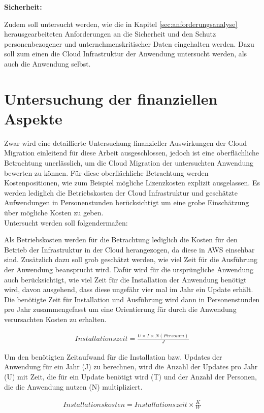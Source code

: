 \textbf{Sicherheit:}

Zudem soll untersucht werden, wie die in Kapitel \ref{sec:anforderungsanalyse} herausgearbeiteten Anforderungen an die Sicherheit und den Schutz personenbezogener und unternehmenskritischer Daten eingehalten werden. Dazu soll zum einen die Cloud Infrastruktur der Anwendung untersucht werden, als auch die Anwendung selbst.

\section{Untersuchung der finanziellen Aspekte}
Zwar wird eine detaillierte Untersuchung finanzieller Auswirkungen der Cloud \mbox{Migration} einleitend für diese Arbeit ausgeschlossen, jedoch ist eine oberflächliche Betrachtung unerlässlich, um die Cloud Migration der untersuchten Anwendung bewerten zu können. Für diese oberflächliche Betrachtung werden Kostenpositionen, wie zum Beispiel mögliche Lizenzkosten explizit ausgelassen. Es werden lediglich die Betriebskosten der Cloud Infrastruktur und geschätzte Aufwendungen in Personenstunden berücksichtigt um eine grobe Einschätzung über mögliche Kosten zu geben. \\

Untersucht werden soll folgendermaßen:

Als Betriebskosten werden für die Betrachtung lediglich die Kosten für den Betrieb der Infrastruktur in der Cloud herangezogen, da diese in \ac{AWS} einsehbar sind. Zusätzlich dazu soll grob geschätzt werden, wie viel Zeit für die Ausführung der Anwendung beansprucht wird. Dafür wird für die ursprüngliche Anwendung auch berücksichtigt, wie viel Zeit für die Installation der Anwendung benötigt wird, davon ausgehend, dass diese ungefähr vier mal im Jahr ein Update erhält. Die benötigte Zeit für Installation und Ausführung wird dann in Personenstunden pro Jahr zusammengefasst um eine Orientierung für durch die Anwendung verursachten Kosten zu erhalten.

\begin{align}
    Installationszeit = \frac{U \times T \times N(Personen)}{J}
\end{align}

Um den benötigten Zeitaufwand für die Installation bzw. Updates der Anwendung für ein Jahr (J) zu berechnen, wird die Anzahl der Updates pro Jahr (U) mit Zeit, die für ein Update benötigt wird (T) und der Anzahl der Personen, die die Anwendung nutzen (N) multipliziert.

\begin{align}
    Installationskosten = Installationszeit \times \frac{K}{W}
\end{align}

